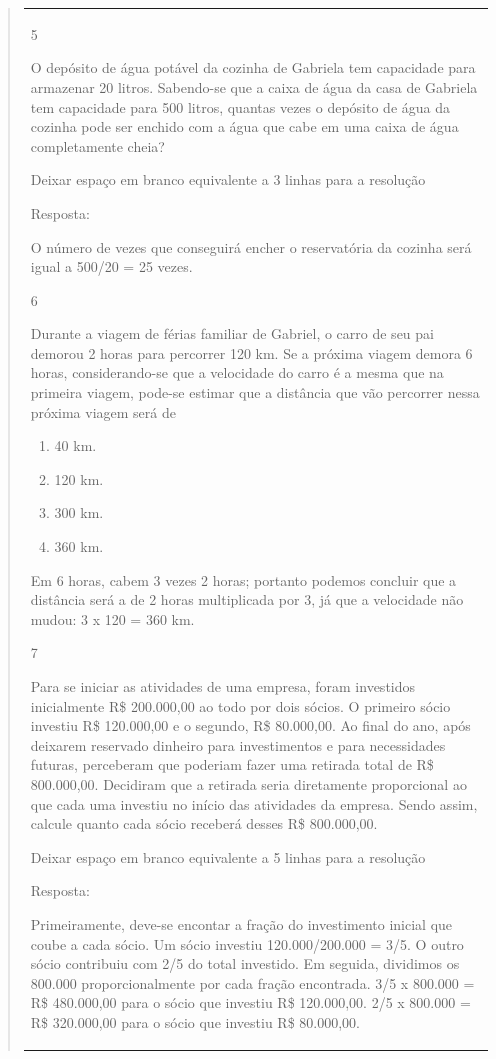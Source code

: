 \begin{mdframed}[linewidth=2pt,linecolor=salmao,roundcorner=2pt]
\begin{itemize}
{\begin{itemize}
\begin{escolha}
{\begin{quote}
{\begin{escolha}
{{{{{\begin{longtable}[]{@{}l@{}}
\begin{itemize}
\num{5}

O depósito de água potável da cozinha de Gabriela tem capacidade para
armazenar 20 litros. Sabendo-se que a caixa de água da casa de Gabriela
tem capacidade para 500 litros, quantas vezes o depósito de água da
cozinha pode ser enchido com a água que cabe em uma caixa de água
completamente cheia?

Deixar espaço em branco equivalente a 3 linhas para a resolução

Resposta:

O número de vezes que conseguirá encher o reservatória da cozinha será
igual a 500/20 = 25 vezes.

\num{6}

Durante a viagem de férias familiar de Gabriel, o carro de seu pai
demorou 2 horas para percorrer 120 km. Se a próxima viagem demora 6
horas, considerando-se que a velocidade do carro é a mesma que na primeira
viagem, pode-se estimar que a distância que vão percorrer nessa próxima
viagem será de

\begin{enumerate}
\item
  40 km.
\item
  120 km.
\item
  300 km.
\item
  360 km.
\end{enumerate}

Em 6 horas, cabem 3 vezes 2 horas; portanto podemos concluir que a
distância será a de 2 horas multiplicada por 3, já que a velocidade não
mudou: 3 x 120 = 360 km.

\num{7}

Para se iniciar as atividades de uma empresa, foram investidos
inicialmente R\$ 200.000,00 ao todo por dois sócios. O primeiro
sócio investiu R\$ 120.000,00 e o segundo, R\$ 80.000,00. Ao final do ano,
após deixarem reservado dinheiro para investimentos e para necessidades
futuras, perceberam que poderiam fazer uma retirada total de R\$ 800.000,00. Decidiram que a retirada seria diretamente proporcional ao que
cada uma investiu no início das atividades da empresa. Sendo assim,
calcule quanto cada sócio receberá desses R\$ 800.000,00.

Deixar espaço em branco equivalente a 5 linhas para a resolução

Resposta:

Primeiramente, deve-se encontar a fração do investimento inicial que
coube a cada sócio.
Um sócio investiu 120.000/200.000 = 3/5.
O outro sócio contribuiu com 2/5 do total investido.
Em seguida, dividimos os 800.000 proporcionalmente por cada fração encontrada.
3/5 x 800.000 = R\$ 480.000,00 para o sócio que investiu R\$ 120.000,00.
2/5 x 800.000 = R\$ 320.000,00 para o sócio que investiu R\$ 80.000,00.


\end{itemize}
\end{longtable}}}}}}
\end{escolha}}
\end{quote}}
\end{escolha}
\end{itemize}}
\end{itemize}
\end{mdframed}
